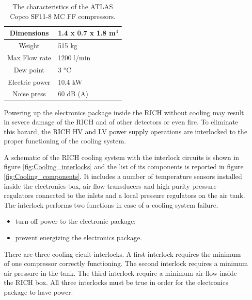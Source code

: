 \documentclass[12pt]{article}
\begin{document}
\begin{table}[htbp]\centering
    \begin{tabular}{||c|l||}
\hline
\hline
Dimensions & 1.4 x 0.7 x 1.8 m$^3$ \\
\hline
Weight & 515 kg \\
\hline
Max Flow rate  & 1200 l/min \\
\hline
Dew point & 3 $^o$C \\
\hline
Electric power & 10.4 kW \\
\hline
Noise press & 60 dB (A) \\
\hline
\hline
    \end{tabular}
    \caption{The characteristics of the ATLAS Copco SF11-8 MC FF compressors. \label{tab:Compressor}}
\end{table}



Powering up the electronics package inside the RICH without cooling may result in severe damage of the RICH and of other detectors or even fire.
To eliminate this hazard, the RICH HV and LV power supply operations are interlocked to the proper functioning of the cooling system.

A schematic of the RICH cooling system with the interlock circuits is shown in figure \ref{fig:Cooling_interlocks} and the list of its components is reported in figure \ref{fig:Cooling_components}.
It includes a number of temperature sensors installed inside the electronics box, air flow transducers and high purity pressure regulators connected to the inlets and a local pressure regulators on the air tank.
The interlock performs two functions in case of a cooling system failure.
\begin{itemize}
\item{turn off power to the electronic package;}
\item{prevent energizing the electronics package.}
\end{itemize}
There are three cooling cicuit interlocks.
A first interlock requires the minimum of one compressor correctly functioning.
The second interlock requires a minimum air pressure in the tank.
The third interlock require a minimum air flow inside the RICH box.
All three interlocks must be true in order for the electronics package to have power.
\end{document}
